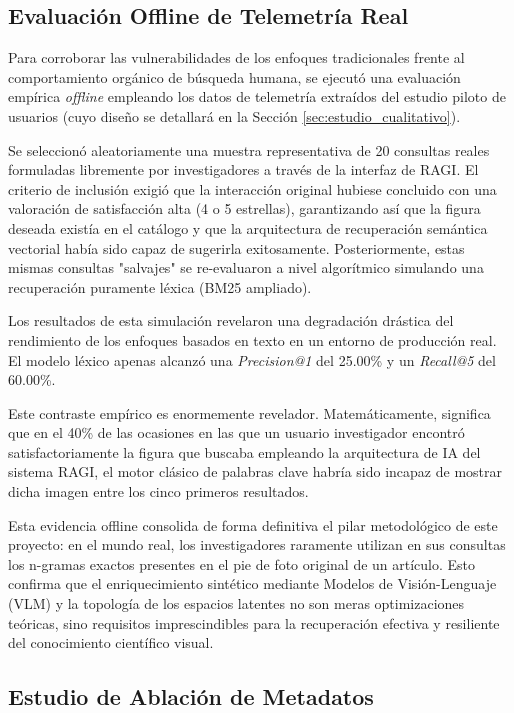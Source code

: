 \documentclass[a4paper]{report}
\begin{document}
\subsection{Evaluación Offline de Telemetría Real}
\label{sec:resultados_telemetria}

Para corroborar las vulnerabilidades de los enfoques tradicionales frente al comportamiento orgánico de búsqueda humana, se ejecutó una evaluación empírica \textit{offline} empleando los datos de telemetría extraídos del estudio piloto de usuarios (cuyo diseño se detallará en la Sección \ref{sec:estudio_cualitativo}). 

Se seleccionó aleatoriamente una muestra representativa de 20 consultas reales formuladas libremente por investigadores a través de la interfaz de RAGI. El criterio de inclusión exigió que la interacción original hubiese concluido con una valoración de satisfacción alta (4 o 5 estrellas), garantizando así que la figura deseada existía en el catálogo y que la arquitectura de recuperación semántica vectorial había sido capaz de sugerirla exitosamente. Posteriormente, estas mismas consultas "salvajes" se re-evaluaron a nivel algorítmico simulando una recuperación puramente léxica (BM25 ampliado).

Los resultados de esta simulación revelaron una degradación drástica del rendimiento de los enfoques basados en texto en un entorno de producción real. El modelo léxico apenas alcanzó una \textit{Precision@1} del 25.00\% y un \textit{Recall@5} del 60.00\%. 

Este contraste empírico es enormemente revelador. Matemáticamente, significa que en el 40\% de las ocasiones en las que un usuario investigador encontró satisfactoriamente la figura que buscaba empleando la arquitectura de IA del sistema RAGI, el motor clásico de palabras clave habría sido incapaz de mostrar dicha imagen entre los cinco primeros resultados. 

Esta evidencia offline consolida de forma definitiva el pilar metodológico de este proyecto: en el mundo real, los investigadores raramente utilizan en sus consultas los n-gramas exactos presentes en el pie de foto original de un artículo. Esto confirma que el enriquecimiento sintético mediante Modelos de Visión-Lenguaje (VLM) y la topología de los espacios latentes no son meras optimizaciones teóricas, sino requisitos imprescindibles para la recuperación efectiva y resiliente del conocimiento científico visual.

\subsection{Estudio de Ablación de Metadatos}
\label{sec:resultados_ablacion}
\end{document}
